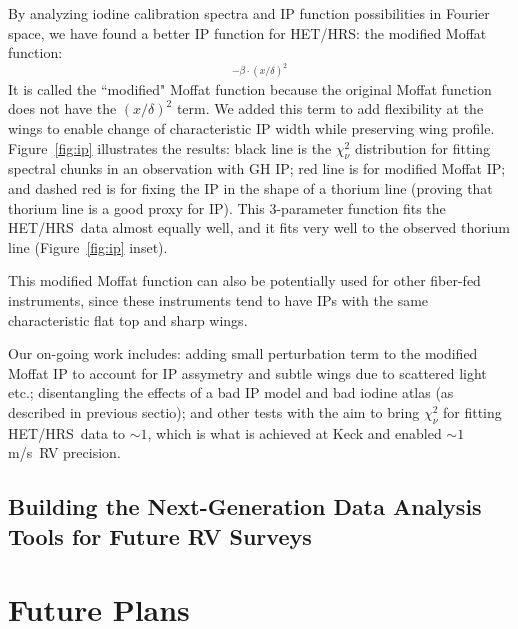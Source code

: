 \documentclass[12pt]{article}
\def\mps{m/s}
\def\hrs{HET/HRS}
\begin{document}
By analyzing iodine calibration spectra and IP function possibilities
in Fourier space, we have found a better IP function for \hrs: the
modified Moffat function:
\begin{equation}
[1+(x/\theta)^2]^{-\beta\cdot(x/\delta)^2}
\end{equation} 
It is called the ``modified" Moffat function because the original
Moffat function does not have the $(x/\delta)^2$ term. We added this
term to add flexibility at the wings to enable change of characteristic
IP width while preserving wing profile. Figure~\ref{fig:ip}
illustrates the results: black line is the $\chi^2_\nu$ distribution
for fitting spectral chunks in an observation with GH IP; red line is
for modified Moffat IP; and dashed red is for fixing the IP in the
shape of a thorium line (proving that thorium line is a good proxy for
IP). This 3-parameter function fits the \hrs\ data almost equally
well, and it fits very well to the observed thorium line
(Figure~\ref{fig:ip} inset).

This modified Moffat function can also be potentially used for other
fiber-fed instruments, since these instruments tend to have IPs with
the same characteristic flat top and sharp wings.

Our on-going work includes: adding small perturbation term to the
modified Moffat IP to account for IP assymetry and subtle wings due to
scattered light etc.; disentangling the effects of a bad IP model and
bad iodine atlas (as described in previous sectio); and other tests
with the aim to bring $\chi^2_\nu$ for fitting \hrs\ data to $\sim 1$,
which is what is achieved at Keck and enabled $\sim 1$\mps\ RV
precision.



\vspace{-10pt}
\subsection{Building the Next-Generation Data Analysis Tools for Future RV Surveys}\label{sec:newrv}
\vspace{-5pt}



\vspace{-10pt}
\section{Future Plans}
\vspace{-5pt}
\end{document}
